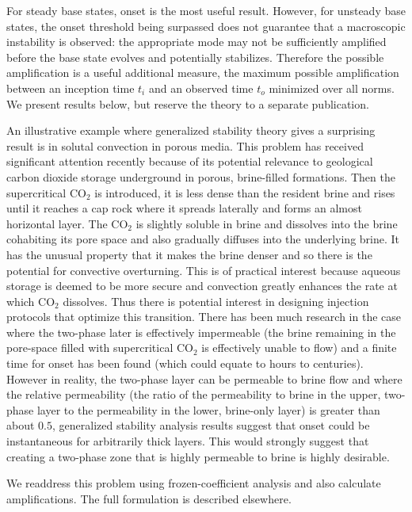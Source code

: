 \documentclass[letterpaper,prl,aps,reprint,superscriptaddress]{revtex4-1}
\newcommand{\COtwo}[1]{CO$_2$ }
\begin{document}
For steady base states, onset is the most useful result.  However, for unsteady base states, the onset threshold being surpassed does not guarantee that a macroscopic instability is observed: the appropriate mode may not be sufficiently amplified before the base state evolves and potentially stabilizes.  Therefore the possible amplification is a useful additional measure, the maximum possible amplification between an inception time $t_i$ and an observed time $t_o$ minimized over all norms.  We present results below, but reserve the theory to a separate publication.

An illustrative example where generalized stability theory gives a surprising result is in solutal convection in porous media.  This problem has received significant attention recently because of its potential relevance to geological carbon dioxide storage underground in porous, brine-filled formations.  Then the supercritical \COtwo{} is introduced, it is less dense than the resident brine and rises until it reaches a cap rock where it spreads laterally and forms an almost horizontal layer.  The \COtwo{} is slightly soluble in brine and dissolves into the brine cohabiting its pore space and also gradually diffuses into the underlying brine.  It has the unusual property that it makes the brine denser and so there is the potential for convective overturning.  This is of practical interest because aqueous storage is deemed to be more secure and convection greatly enhances the rate at which \COtwo{} dissolves.  Thus there is potential interest in designing injection protocols that optimize this transition.  There has been much research in the case where the two-phase later is effectively impermeable (the brine remaining in the pore-space filled with supercritical \COtwo{} is effectively unable to flow) and a finite time for onset has been found (which could equate to hours to centuries).  However in reality, the two-phase layer can be permeable to brine flow and where the relative permeability (the ratio of the permeability to brine in the upper, two-phase layer to the permeability in the lower, brine-only layer) is greater than about $0.5$, generalized stability analysis results suggest that onset could be instantaneous for arbitrarily thick layers.  This would strongly suggest that creating a two-phase zone that is highly permeable to brine is highly desirable.  

We readdress this problem using frozen-coefficient analysis and also calculate amplifications.  The full formulation is described elsewhere.
\end{document}
